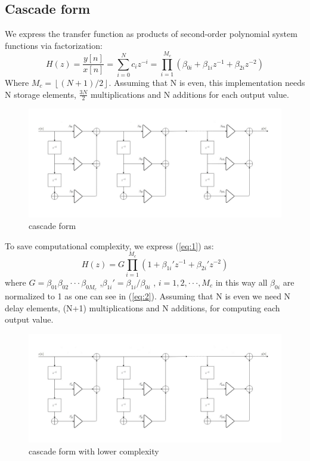 \subsection{Cascade form}
We express the transfer function as products of second-order polynomial system functions via factorization:
\begin{equation} \label{eq:1}
H(z)=\frac{y[n]}{x[n]} =\sum_{i=0}^{N}c_{i}z^{-i}= \prod_{i=1}^{M_{c}}(\beta_{0i}+\beta_{1i}z^{-1}+\beta_{2i}z^{-2})
\end{equation}
Where $M_{c}= \left \lfloor (N+1)/2 \right \rfloor$.
Assuming that N is even, this implementation needs N storage elements, $\frac{3N}{2}$ multiplications and N additions for each output value.
\begin{figure}[H]
    \centering
    \includegraphics[scale=0.35]{images/cascade.jpg}    
    \caption{cascade form}
    \label{fig:cascade}
\end{figure}
To save computational complexity, we express (\ref{eq:1}) as:
\begin{equation} \label{eq:2}
H(z)= G\prod_{i=1}^{M_{c}}(1+\beta_{1i}'z^{-1}+\beta_{2i}'z^{-2})
\end{equation}
where $G=\beta_{01}\beta_{02} \cdot\cdot\cdot\beta_{0M_{c}}$ ,$\beta_{1i}'=\beta_{1i}/\beta_{0i}$ , $i= 1,2,\cdot \cdot \cdot,M_{c}$ in this way all $\beta_{0i}$ are normalized to 1 as one can see in (\ref{eq:2}). Assuming that N is even we need N delay elements, (N+1) multiplications and N additions, for computing each output value.
\begin{figure}[H]
    \centering
    \includegraphics[scale=0.35]{images/cascadeoptimised.jpg}    
    \caption{cascade form with lower complexity}
    \label{fig:cascade_opt}
\end{figure}
